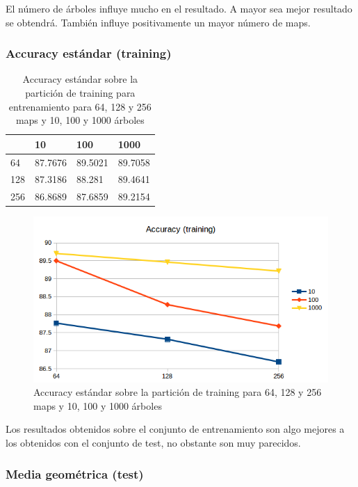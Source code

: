 El número de árboles influye mucho en el resultado. A mayor sea mejor resultado se obtendrá. También influye positivamente un mayor número de maps.

\newpage
\subsubsection{Accuracy estándar (training)}

\begin{table}[H]
	\centering
	\caption{Accuracy estándar sobre la partición de training para entrenamiento para 64, 128 y 256 maps y 10, 100 y 1000 árboles}
	\label{tab:accuracy-training}
	\begin{tabular}{l|lll|}
		\cline{2-4}
		& 10    & 100    & 1000    \\ \hline
		\multicolumn{1}{|l|}{64}  & 87.7676 & 89.5021 & 89.7058 \\
		\multicolumn{1}{|l|}{128} & 87.3186 & 88.281  & 89.4641 \\
		\multicolumn{1}{|l|}{256} & 86.8689 & 87.6859 & 89.2154 \\ \hline
	\end{tabular}
\end{table}

\begin{figure}[H]
	\centering
	\includegraphics[width=12cm]{img/accuracy-training}
	\caption{Accuracy estándar sobre la partición de training para 64, 128 y 256 maps y 10, 100 y 1000 árboles}
	\label{fig:accuracy-training}
\end{figure}

Los resultados obtenidos sobre el conjunto de entrenamiento son algo mejores a los obtenidos con el conjunto de test, no obstante son muy parecidos.

\newpage
\subsubsection{Media geométrica (test)}

